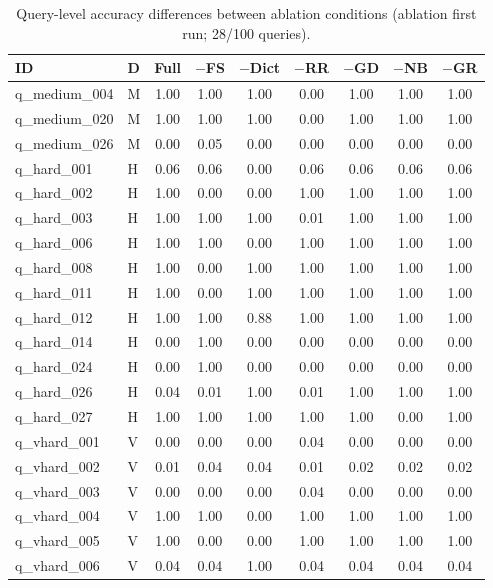 \begin{table}[htbp]
\centering
\caption{Query-level accuracy differences between ablation conditions (ablation first run; 28/100 queries).}
\label{tab:sup_ablation_diff}
\scriptsize
\begin{tabular}{@{}llccccccc@{}}
  \toprule
  ID & D & Full & $-$FS & $-$Dict & $-$RR & $-$GD & $-$NB & $-$GR \\
  \midrule
    q\_medium\_004 & M & 1.00 & 1.00 & 1.00 & 0.00 & 1.00 & 1.00 & 1.00 \\
    q\_medium\_020 & M & 1.00 & 1.00 & 1.00 & 0.00 & 1.00 & 1.00 & 1.00 \\
    q\_medium\_026 & M & 0.00 & 0.05 & 0.00 & 0.00 & 0.00 & 0.00 & 0.00 \\
    q\_hard\_001 & H & 0.06 & 0.06 & 0.00 & 0.06 & 0.06 & 0.06 & 0.06 \\
    q\_hard\_002 & H & 1.00 & 0.00 & 0.00 & 1.00 & 1.00 & 1.00 & 1.00 \\
    q\_hard\_003 & H & 1.00 & 1.00 & 1.00 & 0.01 & 1.00 & 1.00 & 1.00 \\
    q\_hard\_006 & H & 1.00 & 1.00 & 0.00 & 1.00 & 1.00 & 1.00 & 1.00 \\
    q\_hard\_008 & H & 1.00 & 0.00 & 1.00 & 1.00 & 1.00 & 1.00 & 1.00 \\
    q\_hard\_011 & H & 1.00 & 0.00 & 1.00 & 1.00 & 1.00 & 1.00 & 1.00 \\
    q\_hard\_012 & H & 1.00 & 1.00 & 0.88 & 1.00 & 1.00 & 1.00 & 1.00 \\
    q\_hard\_014 & H & 0.00 & 1.00 & 0.00 & 0.00 & 0.00 & 0.00 & 0.00 \\
    q\_hard\_024 & H & 0.00 & 1.00 & 0.00 & 0.00 & 0.00 & 0.00 & 0.00 \\
    q\_hard\_026 & H & 0.04 & 0.01 & 1.00 & 0.01 & 1.00 & 1.00 & 1.00 \\
    q\_hard\_027 & H & 1.00 & 1.00 & 1.00 & 1.00 & 1.00 & 0.00 & 1.00 \\
    q\_vhard\_001 & V & 0.00 & 0.00 & 0.00 & 0.04 & 0.00 & 0.00 & 0.00 \\
    q\_vhard\_002 & V & 0.01 & 0.04 & 0.04 & 0.01 & 0.02 & 0.02 & 0.02 \\
    q\_vhard\_003 & V & 0.00 & 0.00 & 0.00 & 0.04 & 0.00 & 0.00 & 0.00 \\
    q\_vhard\_004 & V & 1.00 & 1.00 & 0.00 & 1.00 & 1.00 & 1.00 & 1.00 \\
    q\_vhard\_005 & V & 1.00 & 0.00 & 0.00 & 1.00 & 1.00 & 1.00 & 1.00 \\
    q\_vhard\_006 & V & 0.04 & 0.04 & 1.00 & 0.04 & 0.04 & 0.04 & 0.04 \\

\end{tabular}
\end{table}
